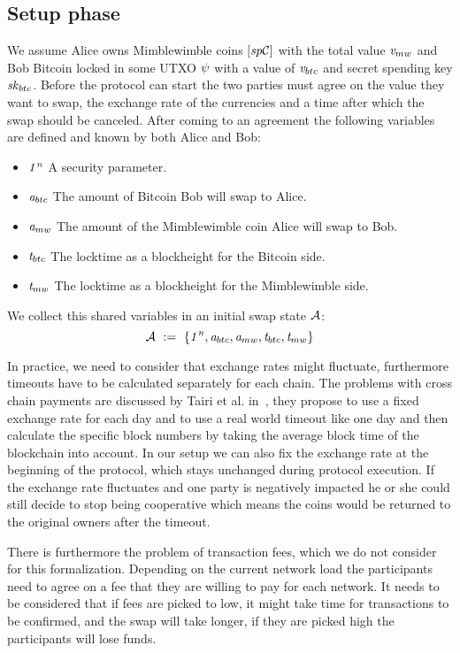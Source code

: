 \subsection{Setup phase}\label{subsec:atom:setup}

We assume Alice owns Mimblewimble coins $[\mathit{sp}\mathcal{C}]$ with the total value $\mathit{v}_{mw}$ and Bob
Bitcoin locked in some UTXO $\psi$ with a value of $\mathit{v}_{btc}$ and secret spending key $\mathit{sk}_{btc}$.
Before the protocol can start the two parties must agree on the value they want to swap, the exchange rate of the currencies and a time after which the swap should be canceled.
After coming to an agreement the following variables are defined and known by both Alice and Bob:
\begin{itemize}
    \item $\mathit{1^n}$ A security parameter.
    \item $\mathit{a}_{btc}$ The amount of Bitcoin Bob will swap to Alice.
    \item $\mathit{a}_{mw}$ The amount of the Mimblewimble coin Alice will swap to Bob.
    \item $\mathit{t}_{btc}$ The locktime as a blockheight for the Bitcoin side.
    \item $\mathit{t}_{mw}$ The locktime as a blockheight for the Mimblewimble side.
\end{itemize}
We collect this shared variables in an initial swap state $\mathcal{A}$:
\[ \mathcal{A} ~:=~ \{ \mathit{1^n}, \mathit{a}_{btc}, \mathit{a}_{mw}, \mathit{t}_{btc}, \mathit{t}_{mw} \} \]

In practice, we need to consider that exchange rates might fluctuate, furthermore timeouts have to be calculated separately for each chain.
The problems with cross chain payments are discussed by Tairi et al. in~\cite{tairi2019a2l}, they propose to use a fixed exchange rate for each day and to use a real world timeout like one day and then calculate the specific block numbers by taking the average block time of the blockchain into account.
In our setup we can also fix the exchange rate at the beginning of the protocol, which stays unchanged during protocol execution.
If the exchange rate fluctuates and one party is negatively impacted he or she could still decide to stop being cooperative which means the coins would be returned to the original owners after the timeout.

There is furthermore the problem of transaction fees, which we do not consider for this formalization.
Depending on the current network load the participants need to agree on a fee that they are willing to pay for each network.
It needs to be considered that if fees are picked to low, it might take time for transactions to be confirmed, and the swap will take longer, if they are picked high the participants will lose funds.

